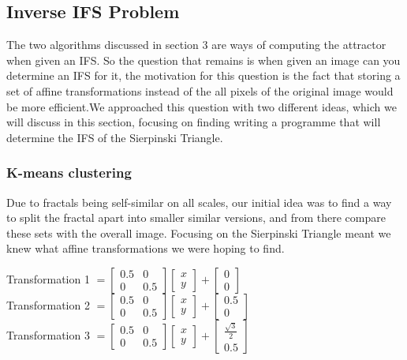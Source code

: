 \documentclass[a4paper,11pt, titlepage]{article}
\theoremstyle{definition}
\theoremstyle{plain}
\theoremstyle{remark}
\theoremstyle{definition}
\begin{document}
\newpage
\subsection{Inverse IFS Problem}
The two algorithms discussed in section 3 are ways of computing the attractor when given an IFS. So the question that remains is when given an image can you determine an IFS for it, the motivation for this question is the fact that storing a set of affine transformations instead of the all pixels of the original image would be more efficient.We approached this question with two different ideas, which we will discuss in this section, focusing on finding writing a programme that will determine the IFS of the Sierpinski Triangle.

\subsubsection{K-means clustering}
Due to fractals being self-similar on all scales, our initial idea was to find a way to split the fractal apart into smaller similar versions, and from there compare these sets with the overall image. Focusing on the Sierpinski Triangle meant we knew what affine transformations we were hoping to find. 

Transformation 1 $=\begin{bmatrix} 0.5 &0\\0&0.5\end{bmatrix}\begin{bmatrix} x\\y \end{bmatrix} + \begin{bmatrix}0\\0\end{bmatrix}$
\\
Transformation 2 $=\begin{bmatrix} 0.5 &0\\0&0.5\end{bmatrix}\begin{bmatrix} x\\y \end{bmatrix} + \begin{bmatrix}0.5\\0\end{bmatrix}$
\\
Transformation 3 $=\begin{bmatrix} 0.5 &0\\0&0.5\end{bmatrix}\begin{bmatrix} x\\y \end{bmatrix} + \begin{bmatrix}\frac{\sqrt{3}}{2}\\0.5\end{bmatrix}$
\\
\end{document}
